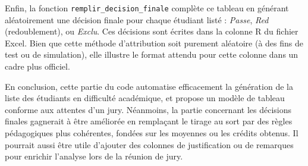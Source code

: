 \documentclass{article}
\begin{document}
Enfin, la fonction \texttt{remplir\_decision\_finale} complète ce tableau en générant aléatoirement une décision finale pour chaque étudiant listé : \textit{Passe}, \textit{Red} (redoublement), ou \textit{Exclu}. Ces décisions sont écrites dans la colonne R du fichier Excel. Bien que cette méthode d’attribution soit purement aléatoire (à des fins de test ou de simulation), elle illustre le format attendu pour cette colonne dans un cadre plus officiel.

En conclusion, cette partie du code automatise efficacement la génération de la liste des étudiants en difficulté académique, et propose un modèle de tableau conforme aux attentes d’un jury. Néanmoins, la partie concernant les décisions finales gagnerait à être améliorée en remplaçant le tirage au sort par des règles pédagogiques plus cohérentes, fondées sur les moyennes ou les crédits obtenus. Il pourrait aussi être utile d'ajouter des colonnes de justification ou de remarques pour enrichir l’analyse lors de la réunion de jury.
\end{document}
